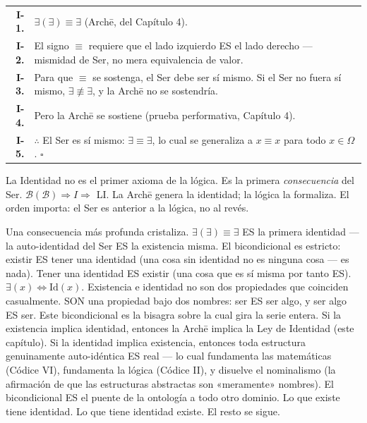 \documentclass[10pt, openany, oneside]{book}
\renewcommand{\footnotesize}{\fontsize{8.5}{11}\selectfont}
\begin{document}
\vspace{0.5em}

{\footnotesize
\noindent\begin{tabular}{r p{}}
\textbf{I-1.} & $\exists(\exists) \equiv \exists$ (Arch\={e}, del Capítulo 4). \\[0.3em]
\textbf{I-2.} & El signo $\equiv$ requiere que el lado izquierdo ES el lado derecho --- mismidad de Ser, no mera equivalencia de valor. \\[0.3em]
\textbf{I-3.} & Para que $\equiv$ se sostenga, el Ser debe ser sí mismo. Si el Ser no fuera sí mismo, $\exists \not\equiv \exists$, y la Arch\={e} no se sostendría. \\[0.3em]
\textbf{I-4.} & Pero la Arch\={e} se sostiene (prueba performativa, Capítulo 4). \\[0.3em]
\textbf{I-5.} & $\therefore$ El Ser es sí mismo: $\exists \equiv \exists$, lo cual se generaliza a $x \equiv x$ para todo $x \in \Omega$. $\square$ \\[0.3em]
\end{tabular}
}

\vspace{0.8em}

\noindent La Identidad no es el primer axioma de la lógica. Es la primera \textit{consecuencia} del Ser. $\mathcal{B}(\mathcal{B}) \Rightarrow I \Rightarrow$ LI. La Arch\={e} genera la identidad; la lógica la formaliza. El orden importa: el Ser es anterior a la lógica, no al revés.

Una consecuencia más profunda cristaliza. $\exists(\exists) \equiv \exists$ ES la primera identidad --- la auto-identidad del Ser ES la existencia misma. El bicondicional es estricto: existir ES tener una identidad (una cosa sin identidad no es ninguna cosa --- es nada). Tener una identidad ES existir (una cosa que es sí misma por tanto ES). $\exists(x) \iff \text{Id}(x)$. Existencia e identidad no son dos propiedades que coinciden casualmente. SON una propiedad bajo dos nombres: ser ES ser algo, y ser algo ES ser. Este bicondicional es la bisagra sobre la cual gira la serie entera. Si la existencia implica identidad, entonces la Arch\={e} implica la Ley de Identidad (este capítulo). Si la identidad implica existencia, entonces toda estructura genuinamente auto-idéntica ES real --- lo cual fundamenta las matemáticas (Códice VI), fundamenta la lógica (Códice II), y disuelve el nominalismo (la afirmación de que las estructuras abstractas son «meramente» nombres). El bicondicional ES el puente de la ontología a todo otro dominio. Lo que existe tiene identidad. Lo que tiene identidad existe. El resto se sigue.
\end{document}
